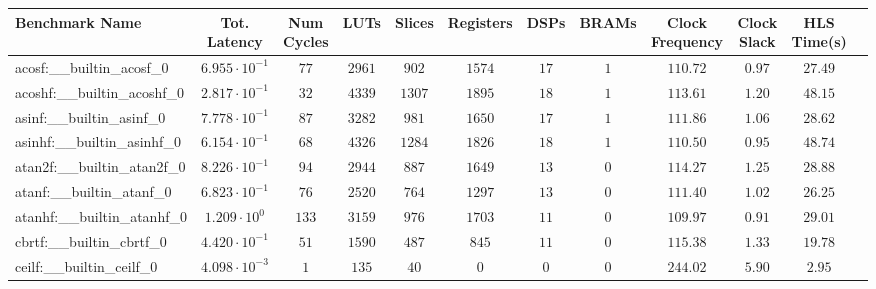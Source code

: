 \begin{tabular}{|l|c|c|c|c|c|c|c|c|c|c|c|}
\hline
Benchmark Name                            & Tot. Latency            & Num Cycles & LUTs      & Slices    & Registers & DSPs    & BRAMs & Clock Frequency & Clock Slack & HLS Time(s) \\
\hline
acosf:\_\_builtin\_acosf\_0               & $ 6.955 \cdot 10^{-1} $ & $ 77     $ & $ 2961  $ & $ 902   $ & $ 1574  $ & $ 17  $ & $ 1 $ & $ 110.72      $ & $ 0.97    $ & $ 27.49   $ \\
acoshf:\_\_builtin\_acoshf\_0             & $ 2.817 \cdot 10^{-1} $ & $ 32     $ & $ 4339  $ & $ 1307  $ & $ 1895  $ & $ 18  $ & $ 1 $ & $ 113.61      $ & $ 1.20    $ & $ 48.15   $ \\
asinf:\_\_builtin\_asinf\_0               & $ 7.778 \cdot 10^{-1} $ & $ 87     $ & $ 3282  $ & $ 981   $ & $ 1650  $ & $ 17  $ & $ 1 $ & $ 111.86      $ & $ 1.06    $ & $ 28.62   $ \\
asinhf:\_\_builtin\_asinhf\_0             & $ 6.154 \cdot 10^{-1} $ & $ 68     $ & $ 4326  $ & $ 1284  $ & $ 1826  $ & $ 18  $ & $ 1 $ & $ 110.50      $ & $ 0.95    $ & $ 48.74   $ \\
atan2f:\_\_builtin\_atan2f\_0             & $ 8.226 \cdot 10^{-1} $ & $ 94     $ & $ 2944  $ & $ 887   $ & $ 1649  $ & $ 13  $ & $ 0 $ & $ 114.27      $ & $ 1.25    $ & $ 28.88   $ \\
atanf:\_\_builtin\_atanf\_0               & $ 6.823 \cdot 10^{-1} $ & $ 76     $ & $ 2520  $ & $ 764   $ & $ 1297  $ & $ 13  $ & $ 0 $ & $ 111.40      $ & $ 1.02    $ & $ 26.25   $ \\
atanhf:\_\_builtin\_atanhf\_0             & $ 1.209 \cdot 10^{0}  $ & $ 133    $ & $ 3159  $ & $ 976   $ & $ 1703  $ & $ 11  $ & $ 0 $ & $ 109.97      $ & $ 0.91    $ & $ 29.01   $ \\
cbrtf:\_\_builtin\_cbrtf\_0               & $ 4.420 \cdot 10^{-1} $ & $ 51     $ & $ 1590  $ & $ 487   $ & $ 845   $ & $ 11  $ & $ 0 $ & $ 115.38      $ & $ 1.33    $ & $ 19.78   $ \\
ceilf:\_\_builtin\_ceilf\_0               & $ 4.098 \cdot 10^{-3} $ & $ 1      $ & $ 135   $ & $ 40    $ & $ 0     $ & $ 0   $ & $ 0 $ & $ 244.02      $ & $ 5.90    $ & $ 2.95    $ \\

\end{tabular}
